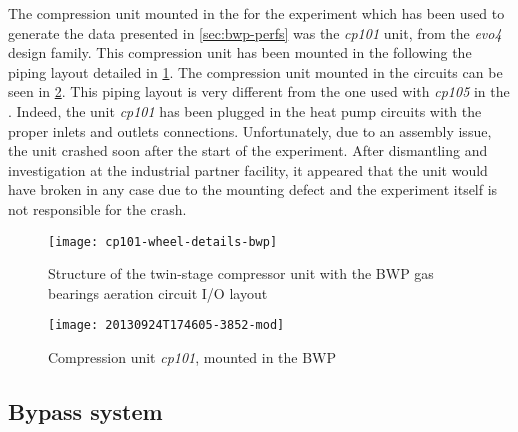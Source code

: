 The compression unit mounted in the \BWP{} for the experiment which
has been used to generate the data presented in \cref{sec:bwp-perfs}
was the \textit{cp101} unit, from the \textit{evo4} design
family. This compression unit has been mounted
in the \BWP{} following the piping layout detailed in
\cref{fig:cp101-struct-bwp}. The compression unit mounted in the
circuits can be seen in \cref{fig:bwp-cp101-mounted}. This piping
layout is very different from the one used with \textit{cp105} in the
\AWP{}. Indeed, the unit \textit{cp101} has been plugged in the heat
pump circuits with the proper inlets and outlets
connections. Unfortunately, due to an assembly issue, the unit crashed
soon after the start of the experiment. After dismantling and
investigation at the industrial partner facility, it appeared that the
unit would have broken in any case due to the mounting defect and the
experiment itself is not responsible for the crash.

\begin{figure}
  \centering
  \texttt{[image: cp101-wheel-details-bwp]}
  \caption{Structure of the twin-stage compressor unit with the BWP
    gas bearings aeration circuit I/O layout}
  \label{fig:cp101-struct-bwp}
\end{figure}

\begin{figure}
  \centering
  \texttt{[image: 20130924T174605-3852-mod]}
  \caption{Compression unit \textit{cp101}, mounted in the BWP}
  \label{fig:bwp-cp101-mounted}
\end{figure}

\subsection{Bypass system}
\label{sec:bwp-bypass-system}


